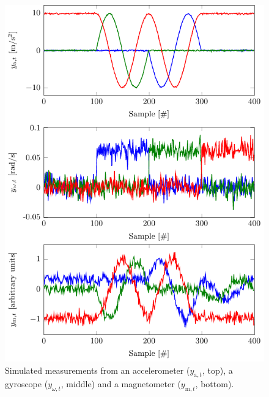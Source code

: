 \begin{figure}
	\centering
	\includegraphics[scale = 1]{figure4_4.pdf}
    	\caption{Simulated measurements from an accelerometer ($y_{\text{a},t}$, top), a gyroscope ($y_{\omega,t}$, middle) and a magnetometer ($y_{\text{m},t}$, bottom).}
	\label{fig:oriEst-simData}	
\end{figure}

